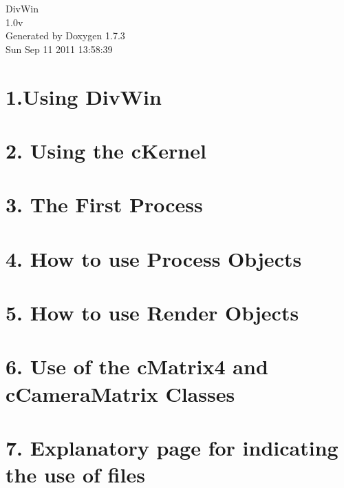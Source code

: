 \documentclass[a4paper]{book}
\begin{document}
\hypersetup{pageanchor=false}
\begin{titlepage}
\vspace*{7cm}
\begin{center}
{\Large DivWin \\[1ex]\large 1.0v }\\
\vspace*{1cm}
{\large Generated by Doxygen 1.7.3}\\
\vspace*{0.5cm}
{\small Sun Sep 11 2011 13:58:39}\\
\end{center}
\end{titlepage}
\clearemptydoublepage
{}
\tableofcontents
\clearemptydoublepage
{}
\hypersetup{pageanchor=true}
\chapter{1.Using DivWin}
\label{DivWinExplanation}
\hypertarget{DivWinExplanation}{}

\chapter{2. Using the cKernel}
\label{cKernelExplanation}
\hypertarget{cKernelExplanation}{}

\chapter{3. The First Process}
\label{CoreExamples}
\hypertarget{CoreExamples}{}

\chapter{4. How to use Process Objects}
\label{ProcessExplanation}
\hypertarget{ProcessExplanation}{}

\chapter{5. How to use Render Objects}
\label{RenderObjectExplanation}
\hypertarget{RenderObjectExplanation}{}

\chapter{6. Use of the cMatrix4 and cCameraMatrix Classes}
\label{Matrix4Explanation}
\hypertarget{Matrix4Explanation}{}

\chapter{7. Explanatory page for indicating the use of files}
\label{FileHandlerExplanation}
\hypertarget{FileHandlerExplanation}{}

\end{document}
